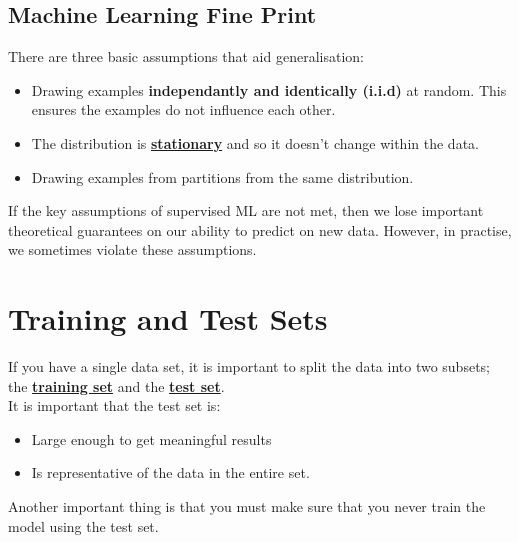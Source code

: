 \documentclass[12pt]{article}
\begin{document}
\subsection{Machine Learning Fine Print}
There are three basic assumptions that aid generalisation:
\begin{itemize}
	\item Drawing examples \textbf{independantly and identically (i.i.d)} at random. This ensures the examples do not influence each other.
	\item The distribution is \href{https://developers.google.com/machine-learning/glossary#stationarity}{\textbf{stationary}} and so it doesn't change within the data.
	\item Drawing examples from partitions from the same distribution.
\end{itemize}

If the key assumptions of supervised ML are not met, then we lose important theoretical guarantees on our ability to predict on new data. However, in practise, we sometimes violate these assumptions.

\section{Training and Test Sets}
If you have a single data set, it is important to split the data into two subsets; the \href{https://developers.google.com/machine-learning/glossary#training_set}{\textbf{training set}} and the \href{https://developers.google.com/machine-learning/glossary#test_set}{\textbf{test set}}.
\\It is important that the test set is:
\begin{itemize}
	\item Large enough to get meaningful results
	\item Is representative of the data in the entire set.
\end{itemize}
Another important thing is that you must make sure that you never train the model using the test set.
\end{document}
